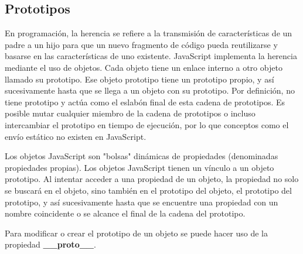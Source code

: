 \documentclass{article}
\begin{document}
\subsection{Prototipos}

En programación, la herencia se refiere a la transmisión de características de un padre a un hijo para que un nuevo fragmento de código pueda reutilizarse
y basarse en las características de uno existente. JavaScript implementa la herencia mediante el uso de objetos. Cada objeto tiene un enlace interno a otro
objeto llamado su prototipo. Ese objeto prototipo tiene un prototipo propio, y así sucesivamente hasta que se llega a un objeto con su prototipo. Por definición,
no tiene prototipo y actúa como el eslabón final de esta cadena de prototipos. Es posible mutar cualquier miembro de la cadena de prototipos o incluso intercambiar
el prototipo en tiempo de ejecución, por lo que conceptos como el envío estático no existen en JavaScript.

Los objetos JavaScript son "bolsas" dinámicas de propiedades (denominadas propiedades propias). Los objetos JavaScript tienen un vínculo a un objeto prototipo.
Al intentar acceder a una propiedad de un objeto, la propiedad no solo se buscará en el objeto, sino también en el prototipo del objeto, el prototipo del prototipo,
y así sucesivamente hasta que se encuentre una propiedad con un nombre coincidente o se alcance el final de la cadena del prototipo.

Para modificar o crear el prototipo de un objeto se puede hacer uso de la propiedad \textbf{\_\_proto\_\_}.
\end{document}
